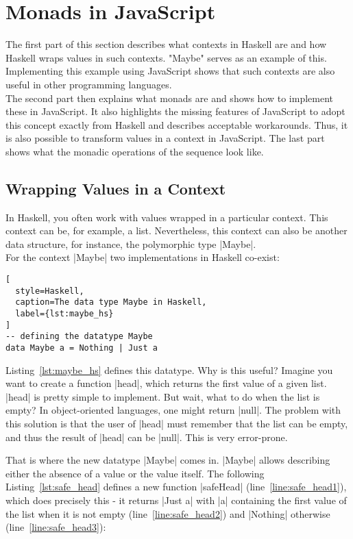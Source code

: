 \section{Monads in JavaScript} %
\label{sec:Monads in JavaScript}
The first part of this section describes what contexts in Haskell are and how
Haskell wraps values in such contexts. "Maybe" serves as an example of this.
Implementing this example using JavaScript shows that such contexts are also
useful in other programming languages.\\
The second part then explains what monads are and shows how to implement these
in JavaScript. It also highlights the missing features of JavaScript to adopt
this concept exactly from Haskell and describes acceptable workarounds. Thus, it
is also possible to transform values in a context in JavaScript. The
last part shows what the monadic operations of the sequence look like.

\subsection{Wrapping Values in a Context} %
\label{sub:Wrapping values in a context}

In Haskell, you often work with values wrapped in a particular context. This
context can be, for example, a list. Nevertheless, this context can also be
another data structure, for instance, the polymorphic type |Maybe|. \\
For the context |Maybe| two implementations in Haskell co-exist:

\begin{lstlisting}[
  style=Haskell,
  caption=The data type Maybe in Haskell,
  label={lst:maybe_hs}
]
-- defining the datatype Maybe
data Maybe a = Nothing | Just a
\end{lstlisting}

Listing~\ref{lst:maybe_hs} defines this datatype. Why is this useful?
Imagine you want to create a function |head|, which returns the first value of
a given list. |head| is pretty simple to implement. But wait, what to do when
the list is empty? In object-oriented languages, one might return |null|. The
problem with this solution is that the user of |head| must remember that the
list can be empty, and thus the result of |head| can be |null|. This is very
error-prone.

That is where the new datatype |Maybe| comes in. |Maybe| allows describing
either the absence of a value or the value itself. The following
Listing~\ref{lst:safe_head} defines a new function |safeHead|
(line~\ref{line:safe_head1}), which does precisely this - it returns |Just a|
with |a| containing the first value of the list when it is not empty
(line~\ref{line:safe_head2}) and |Nothing| otherwise (line~\ref{line:safe_head3}):

